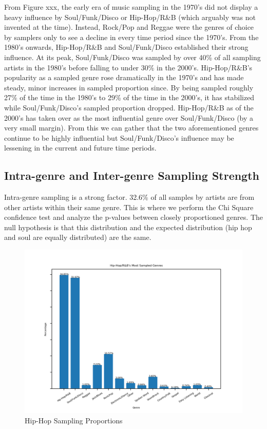 \documentclass[pageno]{jpaper}
\begin{document}
From Figure xxx, the early era of music sampling in the 1970's did not display a heavy influence by Soul/Funk/Disco or Hip-Hop/R\&B (which arguably was not invented at the time). Instead, Rock/Pop and Reggae were the genres of choice by samplers only to see a decline in every time period since the 1970's. From the 1980's onwards, Hip-Hop/R\&B and Soul/Funk/Disco established their strong influence. At its peak, Soul/Funk/Disco was sampled by over 40\% of all sampling artists in the 1980's before falling to under 30\% in the 2000's. Hip-Hop/R\&B's popularity as a sampled genre rose dramatically in the 1970's and has made steady, minor increases in sampled proportion since. By being sampled roughly 27\% of the time in the 1980's to 29\% of the time in the 2000's, it has stabilized while Soul/Funk/Disco's sampled proportion dropped. Hip-Hop/R\&B as of the 2000's has taken over as the most influential genre over Soul/Funk/Disco (by a very small margin). From this we can gather that the two aforementioned genres continue to be highly influential but Soul/Funk/Disco's influence may be lessening in the current and future time periods.
\subsection{Intra-genre and Inter-genre Sampling Strength}
Intra-genre sampling is a strong factor. 32.6\% of all samples by artists are from other artists within their same genre. This is where we perform the Chi Square confidence test and analyze the p-values between closely proportioned genres. The null hypothesis is that this distribution and the expected distribution (hip hop and soul are equally distributed) are the same.
\begin{figure}[H]
\includegraphics{./genreRatio/genreRatioHiphop}
\caption{Hip-Hop Sampling Proportions}
\centering
\end{figure}
\end{document}
